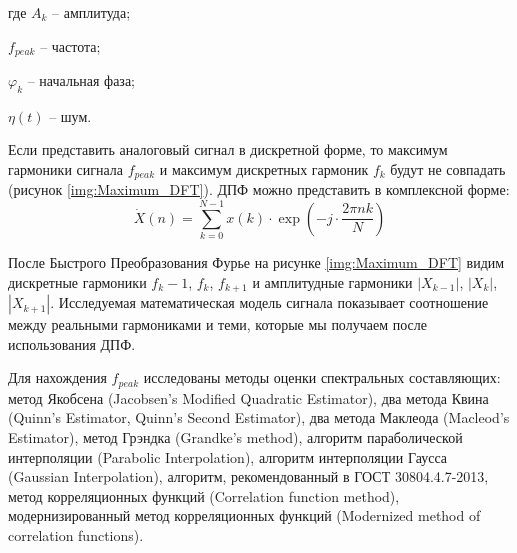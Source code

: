где $A_k$ -- амплитуда;

$f_{peak}$ -- частота;

$\varphi_k$ -- начальная фаза;

$\eta(t)$ -- шум. 

Если представить аналоговый сигнал в дискретной форме, то 
максимум гармоники сигнала $f_{peak}$ и максимум дискретных гармоник $f_k$ будут не совпадать (рисунок \ref{img:Maximum_DFT}). ДПФ можно представить в комплексной форме:
\begin{equation}
	\label{eq:equation4}
	\dot{X}(n)= \displaystyle\sum_{k=0}^{N-1} x(k) \cdot \exp\left( -j \cdot \frac{2 \pi n k}{N}\right)
\end{equation}  

После Быстрого Преобразования Фурье на рисунке \ref{img:Maximum_DFT} видим дискретные гармоники $f_k-1$, $f_k$, $f_{k+1}$ и амплитудные гармоники $|X_{k-1}|$, $|X_k|$, $|X_{k+1}|$. Исследуемая математическая модель сигнала показывает соотношение между реальными гармониками и теми, которые мы получаем после использования ДПФ. 

Для нахождения $f_{peak}$ исследованы методы оценки спектральных составляющих: метод Якобсена (Jacobsen's Modified Quadratic Estimator), два метода Квина (Quinn's Estimator, Quinn's Second Estimator), два метода Маклеода (Macleod's Estimator), метод Грэндка (Grandke's method), алгоритм параболической интерполяции (Parabolic Interpolation), алгоритм интерполяции Гаусса (Gaussian Interpolation), алгоритм, рекомендованный в ГОСТ 30804.4.7-2013, метод корреляционных функций (Correlation function method), модернизированный метод корреляционных функций (Modernized method of correlation functions).



